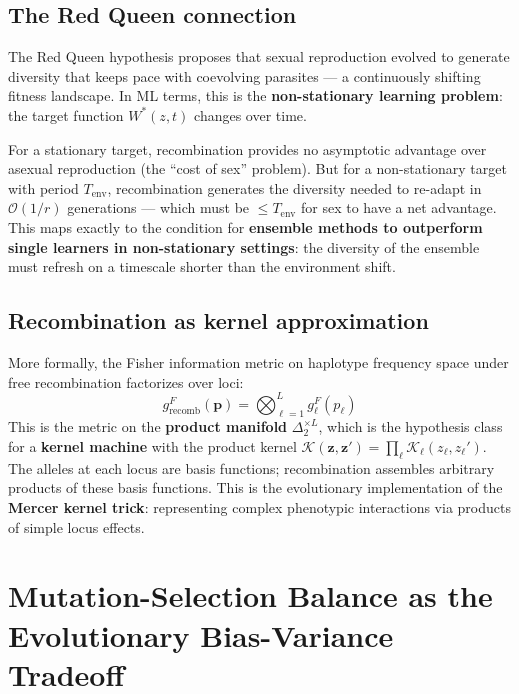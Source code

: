 \documentclass[12pt]{article}
\theoremstyle{remark}
\begin{document}
\subsection{The Red Queen connection}

The Red Queen hypothesis proposes that sexual reproduction evolved to generate diversity that keeps pace with coevolving parasites --- a continuously shifting fitness landscape. In ML terms, this is the \textbf{non-stationary learning problem}: the target function $W^*(z, t)$ changes over time.

For a stationary target, recombination provides no asymptotic advantage over asexual reproduction (the ``cost of sex'' problem). But for a non-stationary target with period $T_\text{env}$, recombination generates the diversity needed to re-adapt in $\mathcal{O}(1/r)$ generations --- which must be $\leq T_\text{env}$ for sex to have a net advantage. This maps exactly to the condition for \textbf{ensemble methods to outperform single learners in non-stationary settings}: the diversity of the ensemble must refresh on a timescale shorter than the environment shift.

\subsection{Recombination as kernel approximation}

More formally, the Fisher information metric on haplotype frequency space under free recombination factorizes over loci:
\[
  g^F_\text{recomb}(\mathbf{p}) = \bigotimes_{\ell=1}^L g^F_\ell(p_\ell)
\]
This is the metric on the \textbf{product manifold} $\Delta_2^{\times L}$, which is the hypothesis class for a \textbf{kernel machine} with the product kernel $\mathcal{K}(\mathbf{z}, \mathbf{z}') = \prod_\ell \mathcal{K}_\ell(z_\ell, z_\ell')$. The alleles at each locus are basis functions; recombination assembles arbitrary products of these basis functions. This is the evolutionary implementation of the \textbf{Mercer kernel trick}: representing complex phenotypic interactions via products of simple locus effects.

\section{Mutation-Selection Balance as the Evolutionary Bias-Variance Tradeoff}
\end{document}
